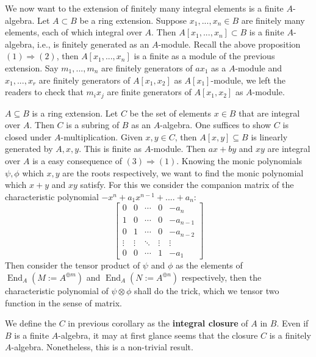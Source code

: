 \documentclass[12pt]{article}
\theoremstyle{definition}
\theoremstyle{plain}
\DeclareMathOperator{\End}{End}
\begin{document}
\medskip
We now want to the extension of finitely many integral elements is a finite $A$-algebra.
\Cor Let $A\subset B$ be a ring extension. Suppose $x_1, ..., x_n\in B$ are finitely many elements, each of which integral over $A$. Then $A[x_1, ..., x_n]\subset B$ is a finite $A$-algebra, i.e., is finitely generated as an $A$-module.
\proof Recall the above proposition $(1)\Rightarrow (2)$, then $A[x_1, ..., x_n]$ is a finite as a module of the previous extension. Say $m_1, ..., m_n$ are finitely generators of $a{x_1}$ as a $A$-module and $x_1, ..., x_r$ are finitely generators of $A[x_1, x_2]$ as $A[x_1]$-module, we left the readers to check that $m_ix_j$ are finite generators of $A[x_1, x_2]$ as $A$-module. \qedhere

\Cor $A\subseteq B$ is a ring extension. Let $C$ be the set of elements $x\in B$ that are integral over $A$. Then $C$ is a subring of $B$ as an $A$-algebra.
\proof One suffices to show $C$ is closed under $A$-multiplication. Given $x, y\in C$, then $A[x,y]\subseteq B$ is linearly generated by $A, x, y$. This is finite as $A$-module. Then $ax+by$ and $xy$ are integral over $A$ is a easy consequence of $(3)\Rightarrow (1)$.
\Rmk Knowing the monic polynomials $\psi, \phi$ which $x, y$ are the roots respectively, we want to find the monic polynomial which $x+y$ and $xy$ satisfy. For this we consider the companion matrix of the characteristic polynomial $-x^n+a_1x^{n-1}+....+a_n$:
\begin{equation}
  \begin{bmatrix}
  0 & 0 &\cdots &0 &-a_n\\
  1 & 0 & \cdots &0 &-a_{n-1}\\
  0 & 1 & \cdots  &0 &-a_{n-2}\\
  \vdots & \vdots &\ddots &\vdots &\vdots\\
  0 & 0 &\cdots &1 &-a_1
\end{bmatrix}
\end{equation}
Then consider the tensor product of $\psi$ and $\phi$ as the elements of $\End_A(M:=A^{\oplus m})$ and $\End_A(N:=A^{\oplus n})$ respectively, then the characteristic polynomial of $\psi\otimes\phi$ shall do the trick, which we tensor two function in the sense of matrix.

\Def We define the $C$ in previous corollary as the \textbf{integral closure} of $A$ in $B$.
\Rmk Even if $B$ is a finite $A$-algebra, it may at first glance seems that the closure $C$ is a finitely $A$-algebra. Nonetheless, this is a non-trivial result.
\end{document}
